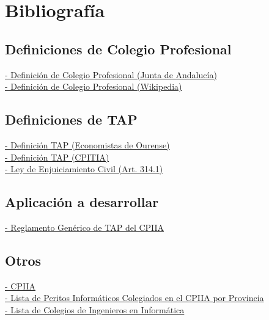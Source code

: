 \chapter{Bibliograf\'ia}

\section{Definiciones de Colegio Profesional}
\href{https://www.juntadeandalucia.es/temas/trabajar/relaciones/colegios.html}{ - Definición de Colegio Profesional (Junta de Andalucía)} \\
\href{https://es.wikipedia.org/wiki/Colegio_profesional}{ - Definición de Colegio Profesional (Wikipedia)} \\

\section{Definiciones de TAP}
\href{http://www.economistasourense.info/es/tap}{ - Definición TAP (Economistas de Ourense)} \\
\href{https://www.cpitia.org/profesionales-colegiados/tap/}{ - Definición TAP (CPITIA)} \\
\href{http://noticias.juridicas.com/base_datos/Privado/l1-2000.l2t1.html#a341}{ - Ley de Enjuiciamiento Civil (Art. 314.1)} \\

\section{Aplicación a desarrollar}
\href{http://cpiiand.es/wordpress/download/reglamentos_actualizados/metatap.pdf}{ - Reglamento Genérico de TAP del CPIIA} \\

\section{Otros}
\href{http://www.cpiiand.es}{ - CPIIA} \\
\href{http://www.cpiiand.es/peritos/peritos_buscar.php}{ - Lista de Peritos Informáticos Colegiados en el CPIIA por Provincia} \\
\href{https://www.ccii.es/colegios-ingenieros-en-informatica}{ - Lista de Colegios de Ingenieros en Informática}
